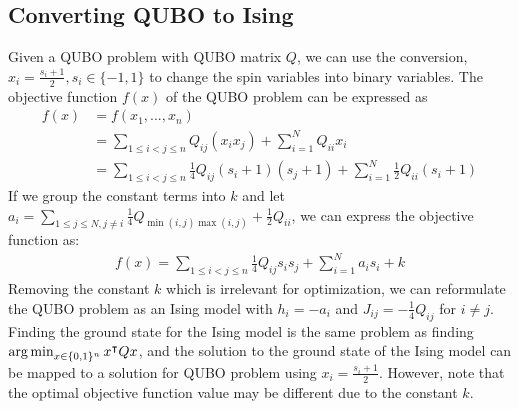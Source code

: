 \subsection{Converting QUBO to Ising}\label{qubotoising}
Given a QUBO problem with QUBO matrix $Q$, we can use the conversion, $x_i = \frac{s_i + 1}{2}, s_i \in \{-1, 1\}$ to change the spin variables into binary variables. The objective function $f(x)$ of the QUBO problem can be expressed as
\begin{align}
    f(x) &= f(x_1, ..., x_n) \nonumber\\
    &= \sum_{1\leq i < j \leq n} Q_{ij}(x_i x_j) + \sum_{i=1}^N Q_{ii} x_i \nonumber \\
    &= \sum_{1\leq i < j \leq n} \frac{1}{4} Q_{ij}(s_i + 1)(s_j + 1) + \sum_{i=1}^N \frac{1}{2} Q_{ii} (s_i + 1) \nonumber
\end{align}
If we group the constant terms into $k$ and let $a_i = \sum_{1\leq j \leq N, j \neq i} \frac{1}{4}Q_{\min(i,j)\max(i,j)} + \frac{1}{2}Q_{ii}$, we can express the objective function as:
\begin{align}
    f(x) = \sum_{1\leq i < j \leq n} \frac{1}{4} Q_{ij}s_i s_j + \sum_{i=1}^N a_i s_i + k \nonumber
\end{align}
Removing the constant $k$ which is irrelevant for optimization, we can reformulate the QUBO problem as an Ising model with $h_i = -a_i$ and $J_{ij} = -\frac{1}{4}Q_{ij}$ for $i \neq j$. Finding the ground state for the Ising model is the same problem as finding $\operatorname*{arg\,min}_{x \in \{0, 1\}^n} x^\intercal Q x$, and the solution to the ground state of the Ising model can be mapped to a solution for QUBO problem using $x_i = \frac{s_i + 1}{2}$. However, note that the optimal objective function value may be different due to the constant $k$.

